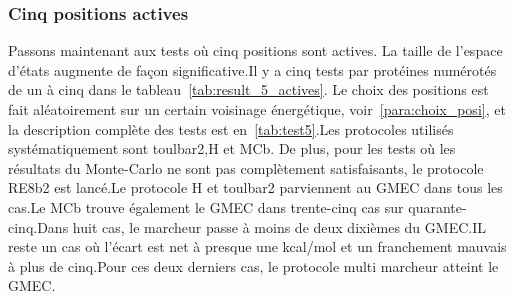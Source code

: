   \subsubsection{Cinq positions actives}
Passons maintenant aux tests où cinq positions sont actives. La taille de l'espace d'états augmente de façon significative.Il y a cinq tests par protéines numérotés de un à cinq dans le tableau~\ref{tab:result_5_actives}. Le choix des positions est fait aléatoirement sur un certain voisinage énergétique, voir~\ref{para:choix_posi}, et la description complète des tests est en~\ref{tab:test5}.Les protocoles utilisés systématiquement sont toulbar2,H et MCb. De plus, pour les tests où les résultats du Monte-Carlo ne sont pas complètement satisfaisants, le protocole RE8b2 est lancé.Le protocole H et toulbar2 parviennent au GMEC dans tous les cas.Le MCb trouve également le GMEC dans trente-cinq cas sur quarante-cinq.Dans huit cas, le marcheur passe à moins de deux dixièmes du GMEC.IL reste un cas où l'écart est net à presque une kcal/mol et un franchement mauvais à plus de cinq.Pour ces deux derniers cas, le protocole multi marcheur atteint le GMEC.

